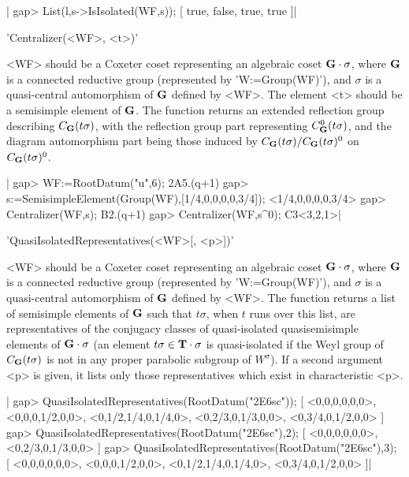 |    gap> List(l,s->IsIsolated(WF,s));           
    [ true, false, true, true ]|


'Centralizer(<WF>, <t>)'

<WF>   should  be   a  Coxeter   coset  representing   an  algebraic  coset
${\bf G}\cdot\sigma$,  where ${\bf G}$ is a  connected reductive group (represented
by  'W:=Group(WF)'), and $\sigma$ is a quasi-central automorphism of ${\bf G}$
defined  by <WF>. The element <t> should  be a semisimple element of ${\bf G}$.
The    function   returns   an   extended   reflection   group   describing
$C_{\bf G}(t\sigma)$,    with   the   reflection    group   part   representing
$C_{\bf G}^0(t\sigma)$,  and the diagram automorphism  part being those induced
by $C_{\bf G}(t\sigma)/C_{\bf G}(t\sigma)^0$ on $C_{\bf G}(t\sigma)^0$.

|    gap> WF:=RootDatum("u",6);                     
    2A5.(q+1)
    gap> s:=SemisimpleElement(Group(WF),[1/4,0,0,0,0,3/4]);
    <1/4,0,0,0,0,3/4>
    gap> Centralizer(WF,s);
    B2.(q+1)
    gap> Centralizer(WF,s^0);
    C3<3,2,1>|

'QuasiIsolatedRepresentatives(<WF>[, <p>])'

<WF>   should  be   a  Coxeter   coset  representing   an  algebraic  coset
${\bf G}\cdot\sigma$,  where ${\bf G}$ is a  connected reductive group (represented
by  'W:=Group(WF)'), and $\sigma$ is  a quasi-central automorphism of ${\bf G}$
defined  by <WF>.  The function  returns a  list of  semisimple elements of
${\bf G}$   such  that   $t\sigma$,  when   $t$  runs   over  this   list,  are
representatives  of the conjugacy classes of quasi-isolated quasisemisimple
elements  of  ${\bf G}\cdot\sigma$  (an  element  $t\sigma\in{\bf T}\cdot\sigma$ is
quasi-isolated  if the Weyl group of  $C_{\bf G}(t\sigma)$ is not in any proper
parabolic  subgroup of $W^\sigma$).  If a second  argument <p> is given, it
lists only those representatives which exist in characteristic <p>.

|    gap> QuasiIsolatedRepresentatives(RootDatum("2E6sc"));
    [ <0,0,0,0,0,0>, <0,0,0,1/2,0,0>, <0,1/2,1/4,0,1/4,0>, 
      <0,2/3,0,1/3,0,0>, <0,3/4,0,1/2,0,0> ]
    gap> QuasiIsolatedRepresentatives(RootDatum("2E6sc"),2);
    [ <0,0,0,0,0,0>, <0,2/3,0,1/3,0,0> ]
    gap> QuasiIsolatedRepresentatives(RootDatum("2E6sc"),3);
    [ <0,0,0,0,0,0>, <0,0,0,1/2,0,0>, <0,1/2,1/4,0,1/4,0>, 
      <0,3/4,0,1/2,0,0> ]|

